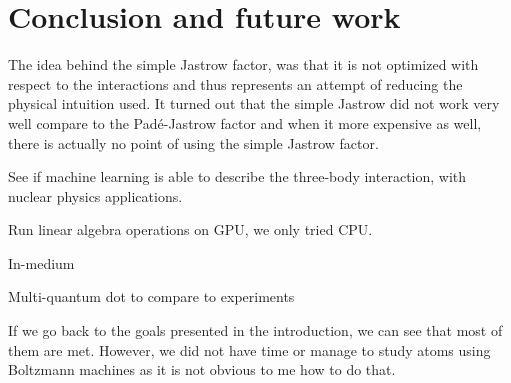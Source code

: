 \chapter{Conclusion and future work} \label{sec:conclusion}
The idea behind the simple Jastrow factor, was that it is not optimized with respect to the interactions and thus represents an attempt of reducing the physical intuition used. It turned out that the simple Jastrow did not work very well compare to the Padé-Jastrow factor and when it more expensive as well, there is actually no point of using the simple Jastrow factor. 

See if machine learning is able to describe the three-body interaction, with nuclear physics applications. 

Run linear algebra operations on GPU, we only tried CPU. 

In-medium

Multi-quantum dot to compare to experiments

If we go back to the goals presented in the introduction, we can see that most of them are met. However, we did not have time or manage to study atoms using Boltzmann machines as it is not obvious to me how to do that. 